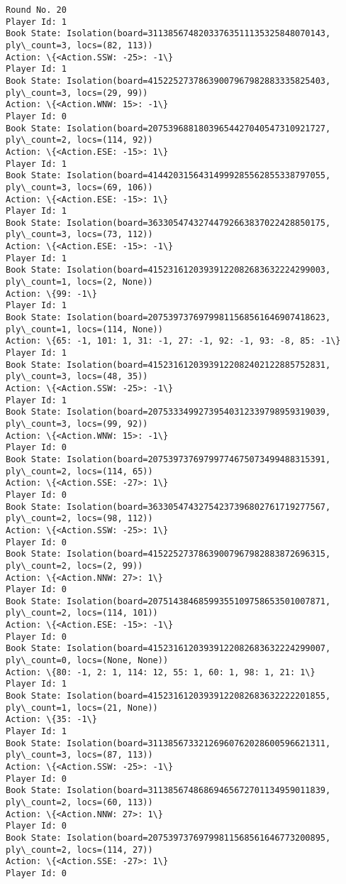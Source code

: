 \documentclass[11pt]{article}
\begin{document}
\begin{Verbatim}[commandchars=\\\{\}]
Round No. 20
Player Id: 1
Book State: Isolation(board=31138567482033763511135325848070143, ply\_count=3, locs=(82, 113))
Action: \{<Action.SSW: -25>: -1\}
Player Id: 1
Book State: Isolation(board=41522527378639007967982883335825403, ply\_count=3, locs=(29, 99))
Action: \{<Action.WNW: 15>: -1\}
Player Id: 0
Book State: Isolation(board=20753968818039654427040547310921727, ply\_count=2, locs=(114, 92))
Action: \{<Action.ESE: -15>: 1\}
Player Id: 1
Book State: Isolation(board=41442031564314999285562855338797055, ply\_count=3, locs=(69, 106))
Action: \{<Action.ESE: -15>: 1\}
Player Id: 1
Book State: Isolation(board=36330547432744792663837022428850175, ply\_count=3, locs=(73, 112))
Action: \{<Action.ESE: -15>: -1\}
Player Id: 1
Book State: Isolation(board=41523161203939122082683632224299003, ply\_count=1, locs=(2, None))
Action: \{99: -1\}
Player Id: 1
Book State: Isolation(board=20753973769799811568561646907418623, ply\_count=1, locs=(114, None))
Action: \{65: -1, 101: 1, 31: -1, 27: -1, 92: -1, 93: -8, 85: -1\}
Player Id: 1
Book State: Isolation(board=41523161203939122082402122885752831, ply\_count=3, locs=(48, 35))
Action: \{<Action.SSW: -25>: -1\}
Player Id: 1
Book State: Isolation(board=20753334992739540312339798959319039, ply\_count=3, locs=(99, 92))
Action: \{<Action.WNW: 15>: -1\}
Player Id: 0
Book State: Isolation(board=20753973769799774675073499488315391, ply\_count=2, locs=(114, 65))
Action: \{<Action.SSE: -27>: 1\}
Player Id: 0
Book State: Isolation(board=36330547432754237396802761719277567, ply\_count=2, locs=(98, 112))
Action: \{<Action.SSW: -25>: 1\}
Player Id: 0
Book State: Isolation(board=41522527378639007967982883872696315, ply\_count=2, locs=(2, 99))
Action: \{<Action.NNW: 27>: 1\}
Player Id: 0
Book State: Isolation(board=20751438468599355109758653501007871, ply\_count=2, locs=(114, 101))
Action: \{<Action.ESE: -15>: -1\}
Player Id: 0
Book State: Isolation(board=41523161203939122082683632224299007, ply\_count=0, locs=(None, None))
Action: \{80: -1, 2: 1, 114: 12, 55: 1, 60: 1, 98: 1, 21: 1\}
Player Id: 1
Book State: Isolation(board=41523161203939122082683632222201855, ply\_count=1, locs=(21, None))
Action: \{35: -1\}
Player Id: 1
Book State: Isolation(board=31138567332126960762028600596621311, ply\_count=3, locs=(87, 113))
Action: \{<Action.SSW: -25>: -1\}
Player Id: 0
Book State: Isolation(board=31138567486869465672701134959011839, ply\_count=2, locs=(60, 113))
Action: \{<Action.NNW: 27>: 1\}
Player Id: 0
Book State: Isolation(board=20753973769799811568561646773200895, ply\_count=2, locs=(114, 27))
Action: \{<Action.SSE: -27>: 1\}
Player Id: 0

\end{Verbatim}
\end{document}

